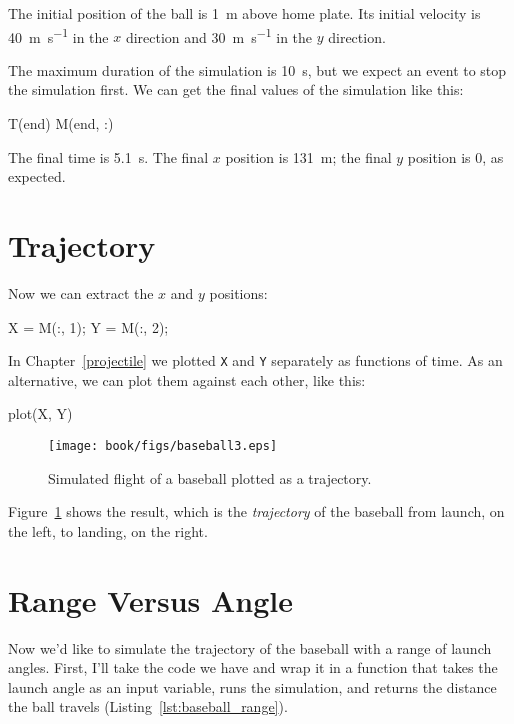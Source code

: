 The initial position of the ball is \SI{1}{\meter} above home plate.  Its initial velocity is \SI{40}{\meter\per\second} in the $x$ direction and \SI{30}{\meter\per\second} in the $y$ direction.


The maximum duration of the simulation is \SI{10}{\second}, but we expect an event to stop the simulation first.  We can get the final values of the simulation like this:
    
\begin{code}
    T(end)
    M(end, :)
\end{code}

The final time is \SI{5.1}{\second}.  The final $x$ position is \SI{131}{\meter}; the final $y$ position is 0, as expected.


\section{Trajectory}

Now we can extract the $x$ and $y$ positions:

\begin{code}
    X = M(:, 1);
    Y = M(:, 2);
\end{code}

In Chapter~\ref{projectile} we plotted {\tt X} and {\tt Y} separately as functions of time.  As an alternative, we can plot them against each other, like this:

\begin{code}
    plot(X, Y)
\end{code}

\begin{figure}
\centerline{\texttt{[image: book/figs/baseball3.eps]}}
\caption{Simulated flight of a baseball plotted as a trajectory.}
\label{fig:baseball3}
\end{figure}

Figure~\ref{fig:baseball3} shows the result, which is the \emph{trajectory} of the baseball from launch, on the left, to landing, on the right.



\section{Range Versus Angle}

Now we'd like to simulate the trajectory of the baseball with a range of launch angles.  First, I'll take the code we have and wrap it in a function that takes the launch angle as an input variable, runs the simulation, and returns the distance the ball travels (Listing~\ref{lst:baseball_range}).

